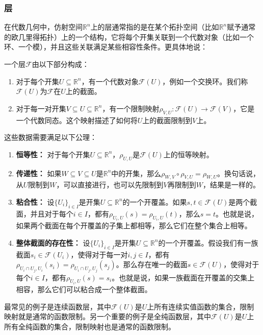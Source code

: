\subsubsection{层}

在代数几何中，仿射空间$\mathbb{R}^n$上的层通常指的是在某个拓扑空间（比如$\mathbb{R}^n$赋予通常的欧几里得拓扑）上的一个结构，它将每个开集关联到一个代数对象（比如一个环、一个模），并且这些关联满足某些相容性条件。更具体地说：

一个层$\mathcal{F}$由以下部分构成：

\begin{enumerate}
	\item 对于每个开集$U \subseteq \mathbb{R}^n$，有一个代数对象$\mathcal{F}(U)$，例如一个交换环。我们称$\mathcal{F}(U)$为$\mathcal{F}$在$U$上的截面。
	\item 对于每一对开集$V \subseteq U \subseteq \mathbb{R}^n$，有一个限制映射$\rho_{V,U}: \mathcal{F}(U) \rightarrow \mathcal{F}(V)$，它是一个代数同态。这个映射描述了如何将$U$上的截面限制到$V$上。
\end{enumerate}

这些数据需要满足以下公理：

\begin{enumerate}
	\item \textbf{恒等性：} 对于每个开集$U \subseteq \mathbb{R}^n$，$\rho_{U,U}$是$\mathcal{F}(U)$上的恒等映射。
	\item \textbf{传递性：} 如果$W \subseteq V \subseteq U$是$\mathbb{R}^n$中的开集，那么$\rho_{W,V} \circ \rho_{V,U} = \rho_{W,U}$。换句话说，从$U$限制到$W$，可以直接进行，也可以先限制到$V$再限制到$W$，结果是一样的。
	\item \textbf{粘合性：} 设$\{U_i\}_{i \in I}$是开集$U \subseteq \mathbb{R}^n$的一个开覆盖。如果$s, t \in \mathcal{F}(U)$是两个截面，并且对于每个$i \in I$，都有$\rho_{U_i, U}(s) = \rho_{U_i, U}(t)$，那么$s = t$。也就是说，如果两个截面在每个开覆盖的子集上都相等，那么它们在整个集合上相等。
	\item \textbf{整体截面的存在性：} 设$\{U_i\}_{i \in I}$是开集$U \subseteq \mathbb{R}^n$的一个开覆盖。假设我们有一族截面$s_i \in \mathcal{F}(U_i)$，使得对于每一对$i, j \in I$，都有$\rho_{U_i \cap U_j, U_i}(s_i) = \rho_{U_i \cap U_j, U_j}(s_j)$。那么存在唯一的截面$s \in \mathcal{F}(U)$，使得对于每个$i \in I$，都有$\rho_{U_i, U}(s) = s_i$。也就是说，如果一族截面在开覆盖的交集上相容，那么它们可以粘合成一个整体截面。
\end{enumerate}

最常见的例子是连续函数层，其中$\mathcal{F}(U)$是$U$上所有连续实值函数的集合，限制映射就是通常的函数限制。另一个重要的例子是全纯函数层，其中$\mathcal{F}(U)$是$U$上所有全纯函数的集合，限制映射也是通常的函数限制。

